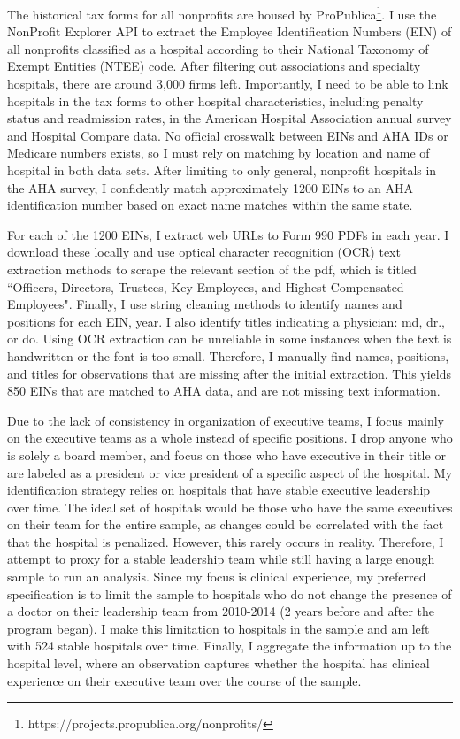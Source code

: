 \documentclass[12pt]{article}
\begin{document}
    The historical tax forms for all nonprofits are housed by ProPublica\footnote{https://projects.propublica.org/nonprofits/}. I use the NonProfit Explorer API to extract the Employee Identification Numbers (EIN) of all nonprofits classified as a hospital according to their National Taxonomy of Exempt Entities (NTEE) code. After filtering out associations and specialty hospitals, there are around 3,000 firms left. Importantly, I need to be able to link hospitals in the tax forms to other hospital characteristics, including penalty status and readmission rates, in the American Hospital Association annual survey and Hospital Compare data. No official crosswalk between EINs and AHA IDs or Medicare numbers exists, so I must rely on matching by location and name of hospital in both data sets. After limiting to only general, nonprofit hospitals in the AHA survey, I confidently match approximately 1200 EINs to an AHA identification number based on exact name matches within the same state. 
    
    For each of the 1200 EINs, I extract web URLs to Form 990 PDFs in each year. I download these locally and use optical character recognition (OCR) text extraction methods to scrape the relevant section of the pdf, which is titled ``Officers, Directors, Trustees, Key Employees, and Highest Compensated Employees". Finally, I use string cleaning methods to identify names and positions for each EIN, year. I also identify titles indicating a physician: md, dr., or do. Using OCR extraction can be unreliable in some instances when the text is handwritten or the font is too small. Therefore, I manually find names, positions, and titles for observations that are missing after the initial extraction. This yields 850 EINs that are matched to AHA data, and are not missing text information. 

    Due to the lack of consistency in organization of executive teams, I focus mainly on the executive teams as a whole instead of specific positions. I drop anyone who is solely a board member, and focus on those who have executive in their title or are labeled as a president or vice president of a specific aspect of the hospital. My identification strategy relies on hospitals that have stable executive leadership over time. The ideal set of hospitals would be those who have the same executives on their team for the entire sample, as changes could be correlated with the fact that the hospital is penalized. However, this rarely occurs in reality. Therefore, I attempt to proxy for a stable leadership team while still having a large enough sample to run an analysis. Since my focus is clinical experience, my preferred specification is to limit the sample to hospitals who do not change the presence of a doctor on their leadership team from 2010-2014 (2 years before and after the program began). I make this limitation to hospitals in the sample and am left with 524 stable hospitals over time. Finally, I aggregate the information up to the hospital level, where an observation captures whether the hospital has clinical experience on their executive team over the course of the sample. 
\end{document}
